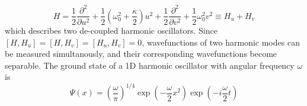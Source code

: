 \documentclass[letterpaper,prb,superscriptaddress]{revtex4}
\theoremstyle{definition}
\begin{document}
\begin{equation}
	H = \frac{1}{2} \frac{\partial ^2}{\partial u^2} + \frac{1}{2}\left( \omega_0^2 + \frac{\kappa}{2} \right)u^2 + \frac{1}{2} \frac{\partial ^2}{\partial v^2} + \frac{1}{2}\omega_0^2 v^2 \equiv H_u + H_v
\end{equation}
which describes two de-coupled harmonic oscillators. Since $[H, H_u] = [H, H_v] = [H_u, H_v] = 0$, wavefunctions of two harmonic modes can be measured simultanously, and their corresponding wavefunctions become separable. The ground state of a 1D harmonic oscillator with angular frequency $\omega$ is
\begin{equation}
	\Psi(x) = \left( \frac{\omega}{\pi} \right)^{1/4}\exp(-\frac{\omega}{2} x^2) \exp(-i\frac{\omega}{2}t)
\end{equation}
\end{document}
